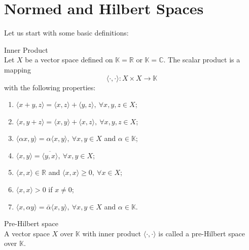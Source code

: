 		\section{Normed and Hilbert Spaces}
			
			Let us start with some basic definitions:
			\begin{definition}\label{def:app:functional:1}
				Inner Product \\
				Let $X$ be a vector space defined on $\mathbb{K}=\mathbb{R}$ or $\mathbb{K}=\mathbb{C}$. The scalar product is a mapping $$\langle\cdot,\cdot\rangle : X\times X \rightarrow \mathbb{K}$$ with the following properties:
				\begin{enumerate}
					\item $\langle x+y,z \rangle = \langle x,z \rangle + \langle y,z\rangle, ~ \forall x, y, z \in X$;
					\item $\langle x,y+z \rangle = \langle x,y \rangle + \langle x,z\rangle, ~ \forall x, y, z \in X$;
					\item $\langle \alpha x, y\rangle = \alpha\langle x, y\rangle,~ \forall x, y \in X$ and $\alpha \in \mathbb{K}$;
					\item $\langle x, y \rangle = \overline{\langle y,x \rangle},~\forall x,y\in X$;
					\item $\langle x,x\rangle\in\mathbb{R}$ and $\langle x,x \rangle \ge 0,~\forall x \in X$;
					\item $\langle x,x \rangle > 0$ if $x\neq0$;
					\item $\langle x,\alpha y\rangle = \bar{\alpha}\langle x,y \rangle,~\forall x,y\in X$ and $\alpha\in\mathbb{K}$.
				\end{enumerate}
			\end{definition}
		
			\begin{definition}\label{def:app:functional:2}
				Pre-Hilbert space\\
				A vector space $X$ over $\mathbb{K}$ with inner product $\langle\cdot,\cdot\rangle$ is called a pre-Hilbert space over $\mathbb{K}$.
			\end{definition}
		
